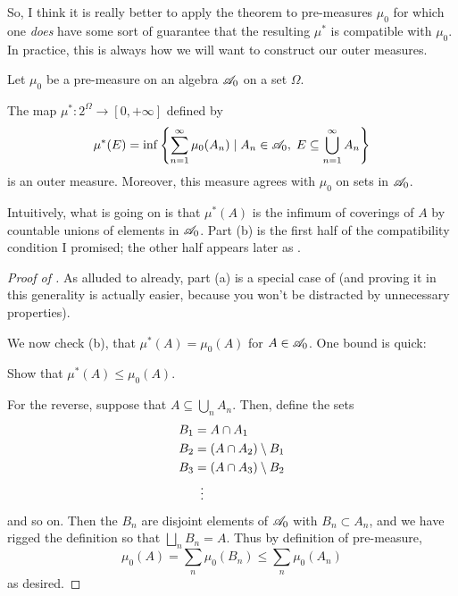 So, I think it is really better to apply the theorem to pre-measures $\mu_0$
for which one \emph{does} have some sort of guarantee
that the resulting $\mu^\ast$ is compatible with $\mu_0$.
In practice, this is always how we will want to construct our outer measures.
\begin{theorem}
	\label{thm:construct_outer}
	Let $\mu_0$ be a pre-measure on an algebra $\mathscr A_0$ on a set $\Omega$.
	\begin{enumerate}[(a)]
		\ii The map $\mu^\ast \colon 2^\Omega \to [0,+\infty]$ defined by
		\[ \mu^\ast(E) = \inf \left\{ \sum_{n=1}^\infty \mu_0(A_n) \mid
			A_n \in \mathscr A_0, \; E \subseteq \bigcup_{n=1}^\infty A_n \right\} \]
		is an outer measure.
		\ii Moreover, this measure agrees with $\mu_0$ on sets in $\mathscr A_0$.
	\end{enumerate}
\end{theorem}
Intuitively, what is going on is that
$\mu^\ast(A)$ is the infimum of coverings of $A$ by
countable unions of elements in $\mathscr A_0$.
Part (b) is the first half of the compatibility condition I promised;
the other half appears later as .

\begin{proof}
	[Proof of ]
	As alluded to already, part (a)
	is a special case of 
	(and proving it in this generality is actually easier,
	because you won't be distracted by unnecessary properties).

	We now check (b), that $\mu^\ast(A) = \mu_0(A)$ for $A \in \mathscr A_0$.
	One bound is quick:
	\begin{ques}
		Show that $\mu^\ast(A) \le \mu_0(A)$.
	\end{ques}
	For the reverse, suppose that $A \subseteq \bigcup_n A_n$.
	Then, define the sets
	\begin{align*}
		B_1 &= A \cap A_1 \\
		B_2 &= (A \cap A_2) \setminus B_1 \\
		B_3 &= (A \cap A_3) \setminus B_2 \\
		&\vdotswithin=
	\end{align*}
	and so on.
	Then the $B_n$ are disjoint elements of $\mathscr A_0$ with $B_n \subset A_n$,
	and we have rigged the definition so that $\bigsqcup_n B_n = A$.
	Thus by definition of pre-measure,
	\[ \mu_0(A) = \sum_n \mu_0(B_n) \le \sum_n \mu_0(A_n) \]
	as desired.
\end{proof}


